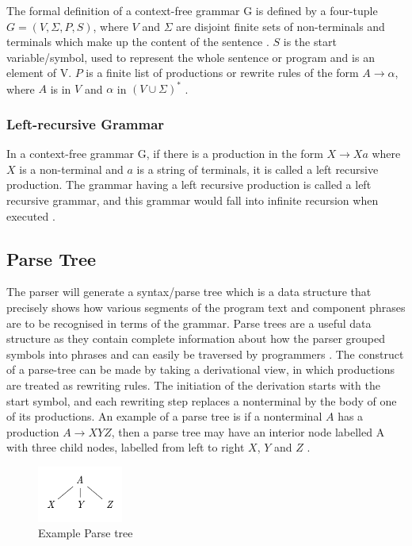 The formal definition of a context-free grammar G is defined by a four-tuple $G = (V, \varSigma, P, S)$, where $V$ and $\varSigma$ are disjoint finite sets of non-terminals and terminals which make up the content of the sentence \cite{aho1971translations}. $S$ is the start variable/symbol, used to represent the whole sentence or program and is an element of V. $P$ is a finite list of productions or rewrite rules of the form $ A \rightarrow \alpha$, where $A$ is in $V$ and $\alpha$ in $(V\cup\varSigma)^\ast$ \cite{backus1960report}.

\subsubsection{Left-recursive Grammar}

In a context-free grammar G, if there is a production in the form $X \rightarrow Xa$ where $X$ is a non-terminal and $a$ is a string of terminals, it is called a left recursive production. The grammar having a left recursive production is called a left recursive grammar, and this grammar would fall into infinite recursion when executed \cite{moore2000removing}.

\subsection{Parse Tree}

The parser will generate a syntax/parse tree which is a data structure that precisely shows how various segments of the program text and component phrases are to be recognised in terms of the grammar. Parse trees are a useful data structure as they contain complete information about how the parser grouped symbols into phrases and can easily be traversed by programmers \cite{parr2013definitive}. The construct of a parse-tree can be made by taking a derivational view, in which productions are treated as rewriting rules. The initiation of the derivation starts with the start symbol, and each rewriting step replaces a nonterminal by the body of one of its productions. An example of a parse tree is if a nonterminal $A$ has a production $A \rightarrow XYZ$, then a parse tree may have an interior node labelled A with three child nodes, labelled from left to right $X$, $Y$ and $Z$ \cite{aho2003compilers}. 

\begin{figure}[H]
  \centering
  \includegraphics[width=0.25\textwidth]{images/parse-tree2.PNG}
  \caption{Example Parse tree \cite{aho2003compilers}}
\end{figure}

